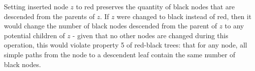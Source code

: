Setting inserted node $ z $ to red preserves the quantity of black nodes that are descended from the parents of $ z $. If $ z $ were changed to black instead of red, then it would change the number of black nodes descended from the parent of $ z $ to any potential children of $ z $ - given that no other nodes are changed during this operation, this would violate property 5 of red-black trees: that for any node, all simple paths from the node to a descendent leaf contain the same number of black nodes.